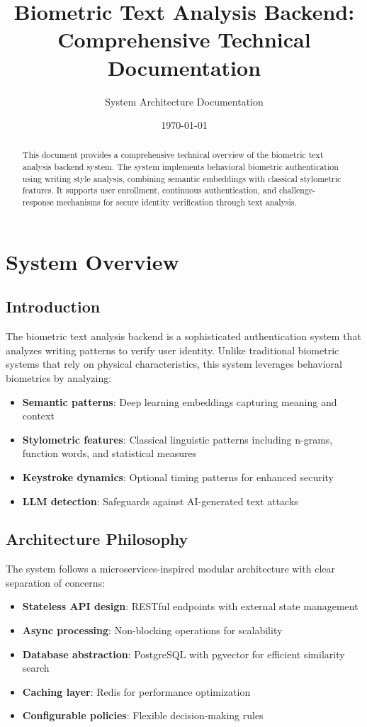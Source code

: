 \documentclass[12pt,a4paper]{article}
\title{\textbf{Biometric Text Analysis Backend: \\
        Comprehensive Technical Documentation}}
\author{System Architecture Documentation}
\date{\today}
\begin{document}
\maketitle

\begin{abstract}
This document provides a comprehensive technical overview of the biometric text analysis backend system. The system implements behavioral biometric authentication using writing style analysis, combining semantic embeddings with classical stylometric features. It supports user enrollment, continuous authentication, and challenge-response mechanisms for secure identity verification through text analysis.
\end{abstract}

\tableofcontents
\newpage

\section{System Overview}

\subsection{Introduction}
The biometric text analysis backend is a sophisticated authentication system that analyzes writing patterns to verify user identity. Unlike traditional biometric systems that rely on physical characteristics, this system leverages behavioral biometrics by analyzing:

\begin{itemize}
    \item \textbf{Semantic patterns}: Deep learning embeddings capturing meaning and context
    \item \textbf{Stylometric features}: Classical linguistic patterns including n-grams, function words, and statistical measures
    \item \textbf{Keystroke dynamics}: Optional timing patterns for enhanced security
    \item \textbf{LLM detection}: Safeguards against AI-generated text attacks
\end{itemize}

\subsection{Architecture Philosophy}
The system follows a microservices-inspired modular architecture with clear separation of concerns:

\begin{itemize}
    \item \textbf{Stateless API design}: RESTful endpoints with external state management
    \item \textbf{Async processing}: Non-blocking operations for scalability
    \item \textbf{Database abstraction}: PostgreSQL with pgvector for efficient similarity search
    \item \textbf{Caching layer}: Redis for performance optimization
    \item \textbf{Configurable policies}: Flexible decision-making rules
\end{itemize}
\end{document}

